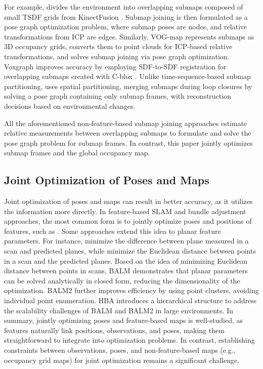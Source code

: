 For example, \cite{wagner2014graph} divides the environment into overlapping submaps composed of small TSDF grids from KinectFusion \cite{izadi2011kinectfusion}. Submap joining is then formulated as a pose graph optimization problem, where submap poses are nodes, and relative transformations from ICP are edges. Similarly, VOG-map \cite{ho2018virtual} represents submaps as 3D occupancy grids, converts them to point clouds for ICP-based relative transformations, and solves submap joining via pose graph optimization. Voxgraph \cite{reijgwart2019voxgraph} improves accuracy by employing SDF-to-SDF registration for overlapping submaps created with C-blox \cite{millane2018c}. Unlike time-sequence-based submap partitioning, \cite{wang2021elastic} uses spatial partitioning, merging submaps during loop closures by solving a pose graph containing only submap frames, with reconstruction decisions based on environmental changes.

All the aforementioned non-feature-based submap joining approaches estimate relative measurements between overlapping submaps to formulate and solve the pose graph problem for submap frames. In contrast, this paper jointly optimizes submap frames and the global occupancy map.

\subsection{Joint Optimization of Poses and Maps}
Joint optimization of poses and maps can result in better accuracy, as it utilizes the information more directly. In feature-based SLAM and bundle adjustment approaches, the most common form is to jointly optimize poses and positions of features, such as \cite{dellaert2006square,triggs2000bundle,konolige2008frameslam,sibley2009adaptive,zhao2015parallaxba}. Some approaches extend this idea to planar feature parameters. For instance, \cite{kaess2015simultaneous,hsiao2017keyframe} minimize the difference between plane measured in a scan and predicted planes, while \cite{trevor2012planar,geneva2018lips,zhou2021pi,zhou2021lidar} minimize the Euclidean distance between points in a scan and the predicted planes. Based on the idea of minimizing Euclidean distance between points in scans, BALM \cite{liu2021balm} demonstrates that planar parameters can be solved analytically in closed form, reducing the dimensionality of the optimization. BALM2 \cite{liu2023efficient} further improves efficiency by using point clusters, avoiding individual point enumeration. HBA \cite{liu2023large} introduces a hierarchical structure to address the scalability challenges of BALM and BALM2 in large environments. In summary, jointly optimizing poses and feature-based maps is well-studied, as features naturally link positions, observations, and poses, making them straightforward to integrate into optimization problems. In contrast, establishing constraints between observations, poses, and non-feature-based maps (e.g., occupancy grid maps) for joint optimization remains a significant challenge.



